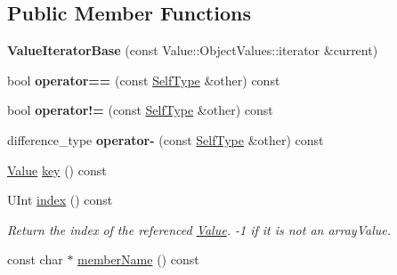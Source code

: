 \subsection*{Public Member Functions}
\begin{DoxyCompactItemize}
\item 
\mbox{\label{class_json_1_1_value_iterator_base_a640e990e5f03a96fd650122a2906f59d}} 
{\bfseries Value\+Iterator\+Base} (const Value\+::\+Object\+Values\+::iterator \&current)
\item 
\mbox{\label{class_json_1_1_value_iterator_base_a1248d8016f88b51371a0fcbd355b3cfd}} 
bool {\bfseries operator==} (const \mbox{\hyperlink{class_json_1_1_value_iterator_base}{Self\+Type}} \&other) const
\item 
\mbox{\label{class_json_1_1_value_iterator_base_aa83bdcc8114b7d040eb8eb42eeed5f4a}} 
bool {\bfseries operator!=} (const \mbox{\hyperlink{class_json_1_1_value_iterator_base}{Self\+Type}} \&other) const
\item 
\mbox{\label{class_json_1_1_value_iterator_base_a98e254263fca5f1fc8fcac7bcb0260bf}} 
difference\+\_\+type {\bfseries operator-\/} (const \mbox{\hyperlink{class_json_1_1_value_iterator_base}{Self\+Type}} \&other) const
\item 
\mbox{\hyperlink{class_json_1_1_value}{Value}} \mbox{\hyperlink{class_json_1_1_value_iterator_base_a3838ba39c43c518cf3ed4aa6ce78ccad}{key}} () const
\item 
\mbox{\label{class_json_1_1_value_iterator_base_a549c66a0bd20e9ae772175a5c0d2e88a}} 
U\+Int \mbox{\hyperlink{class_json_1_1_value_iterator_base_a549c66a0bd20e9ae772175a5c0d2e88a}{index}} () const
\begin{DoxyCompactList}\small\item\em Return the index of the referenced \mbox{\hyperlink{class_json_1_1_value}{Value}}. -\/1 if it is not an array\+Value. \end{DoxyCompactList}\item 
const char $\ast$ \mbox{\hyperlink{class_json_1_1_value_iterator_base_ad9a0e66f1217899993273abcbc8c9283}{member\+Name}} () const
\end{DoxyCompactItemize}
